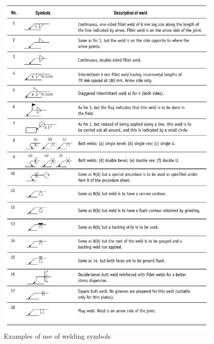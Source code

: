 \begin{figure}[p]
\centering
\includegraphics[width=.9\textwidth]{PIC/CH07/WUE}
\caption{Examples of use of welding symbols \citep{Gorenc2015}}
\end{figure}

